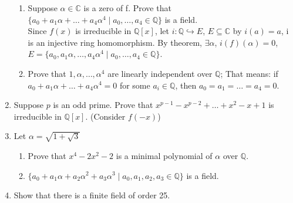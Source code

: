 \documentclass[12pt]{article}
\begin{document}
\begin{enumerate}
\begin{enumerate}
			\item Suppose $\alpha \in \mathbb{C}$ is a zero of f. Prove that $\{a_0 +
					a_1\alpha + \dots + a_4\alpha^4 \mid a_0,\dots,a_4 \in \mathbb{Q}\}$
					is a field.\\
					Since $f(x)$ is irreducible in $\mathbb{Q}[x]$, 
					let $i: \mathbb{Q} \hookrightarrow E$, $E \subseteq \mathbb{C}$ by 
					$i(a) = a$, i is an injective ring homomorphism. By theorem, 
					$\exists \alpha$, $i(f)(\alpha) = 0$, $E = \{a_0, a_1\alpha, \dots,
					a_4\alpha^4 \mid a_0, \dots, a_4 \in \mathbb{Q}\}$.
			\item Prove that $1, \alpha,\dots,\alpha^4$ are linearly independent over
				$\mathbb{Q}$; That means: if $a_0 + a_1\alpha+\dots+a_4\alpha^4 = 0$ for
				some $a_i \in \mathbb{Q}$, then $a_0 = a_1 = \dots = a_4 = 0$.
		\end{enumerate}

	\item Suppose $p$ is an odd prime. Prove that $x^{p-1} - x^{p-2} + \dots + x^2
		- x + 1$ is irreducible in $\mathbb{Q}[x]$. (Consider $f(-x)$)
	
	\item Let $\alpha = \sqrt{1+\sqrt{3}}$
		\begin{enumerate}
			\item Prove that $x^4 - 2x^2 - 2$ is a minimal polynomial of $\alpha$ over
				$\mathbb{Q}$.
			\item $\{a_0 + a_1\alpha + a_2\alpha^2 + a_3\alpha^3 \mid a_0, a_1, a_2,
					a_3 \in \mathbb{Q}\}$ is a field.
		\end{enumerate}

	\item Show that there is a finite field of order 25.

\end{enumerate}
\end{document}
